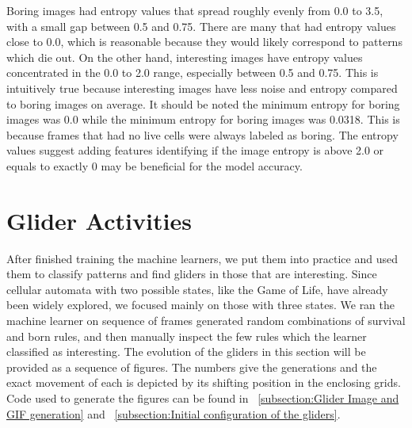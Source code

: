 \documentclass[12pt]{article}
\numberwithin{figure}{section} %
\begin{document}
Boring images had entropy values that spread roughly evenly from 0.0 to 3.5, with a small gap between 0.5 and 0.75. There are many that had entropy values close to 0.0, which is reasonable because they would likely correspond to patterns which die out. On the other hand, interesting images have entropy values concentrated in the 0.0 to 2.0 range, especially between 0.5 and 0.75. This is intuitively true because interesting images have less noise and entropy compared to boring images on average. It should be noted the minimum entropy for boring images was 0.0 while the minimum entropy for boring images was 0.0318. This is because frames that had no live cells were always labeled as boring. The entropy values suggest adding features identifying if the image entropy is above 2.0 or equals to exactly 0 may be beneficial for the model accuracy. 

\newpage
\section{Glider Activities}
\label{Glider Activities}
After finished training the machine learners, we put them into practice and used them to classify patterns and find gliders in those that are interesting. Since cellular automata with two possible states, like the Game of Life, have already been widely explored, we focused mainly on those with three states. We ran the machine learner on sequence of frames generated random combinations of survival and born rules, and then manually inspect the few rules which the learner classified as interesting. The evolution of the gliders in this section will be provided as a sequence of figures. The numbers give the generations and the exact movement of each is depicted by its shifting position in the enclosing grids. Code used to generate the figures can be found in ~\ref{subsection:Glider Image and GIF generation} and ~\ref{subsection:Initial configuration of the gliders}. 
\end{document}
